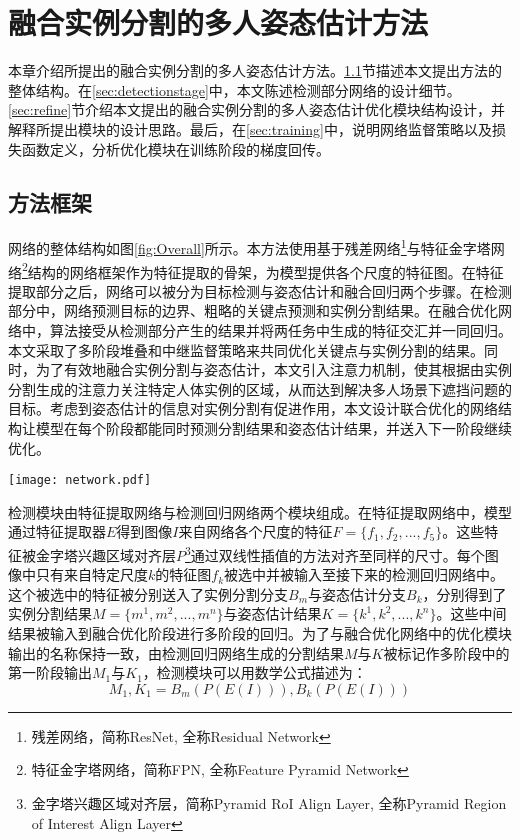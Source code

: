 \chapter{融合实例分割的多人姿态估计方法}
\label{cha:method}
本章介绍所提出的融合实例分割的多人姿态估计方法。\ref{sec:methodoverview}节描述本文提出方法的整体结构。在\ref{sec:detectionstage}中，本文陈述检测部分网络的设计细节。\ref{sec:refine}节介绍本文提出的融合实例分割的多人姿态估计优化模块结构设计，并解释所提出模块的设计思路。最后，在\ref{sec:training}中，说明网络监督策略以及损失函数定义，分析优化模块在训练阶段的梯度回传。

\section{方法框架}
\label{sec:methodoverview}
网络的整体结构如图\ref{fig:Overall}所示。本方法使用基于残差网络\footnote{残差网络，简称ResNet, 全称Residual Network}与特征金字塔网络\footnote{特征金字塔网络，简称FPN, 全称Feature Pyramid Network}结构的网络框架作为特征提取的骨架，为模型提供各个尺度的特征图。在特征提取部分之后，网络可以被分为目标检测与姿态估计和融合回归两个步骤。在检测部分中，网络预测目标的边界、粗略的关键点预测和实例分割结果。在融合优化网络中，算法接受从检测部分产生的结果并将两任务中生成的特征交汇并一同回归。本文采取了多阶段堆叠和中继监督策略来共同优化关键点与实例分割的结果。同时，为了有效地融合实例分割与姿态估计，本文引入注意力机制，使其根据由实例分割生成的注意力关注特定人体实例的区域，从而达到解决多人场景下遮挡问题的目标。考虑到姿态估计的信息对实例分割有促进作用，本文设计联合优化的网络结构让模型在每个阶段都能同时预测分割结果和姿态估计结果，并送入下一阶段继续优化。

\begin{figure*}[htbp]	
	\centering
	\texttt{[image: network.pdf]}
	\caption{网络整体结构}
	\label{fig:Overall}
\end{figure*}

检测模块由特征提取网络与检测回归网络两个模块组成。在特征提取网络中，模型通过特征提取器$E$得到图像$I$来自网络各个尺度的特征$F=\{f_1, f_2, ..., f_5\}$。这些特征被金字塔兴趣区域对齐层$P$\footnote{金字塔兴趣区域对齐层，简称Pyramid RoI Align Layer, 全称Pyramid Region of Interest Align Layer}通过双线性插值的方法对齐至同样的尺寸。每个图像中只有来自特定尺度$k$的特征图$f_k$被选中并被输入至接下来的检测回归网络中。这个被选中的特征被分别送入了实例分割分支$B_m$与姿态估计分支$B_k$，分别得到了实例分割结果$M=\{m^1, m^2, ..., m^n\}$与姿态估计结果$K=\{k^1, k^2, ..., k^n\}$。这些中间结果被输入到融合优化阶段进行多阶段的回归。为了与融合优化网络中的优化模块输出的名称保持一致，由检测回归网络生成的分割结果$M$与$K$被标记作多阶段中的第一阶段输出$M_1$与$K_1$，检测模块可以用数学公式描述为：
\begin{equation}
\label{def:detectnet}
M_1, K_1 = B_m(P(E(I))), B_k(P(E(I)))
\end{equation}

